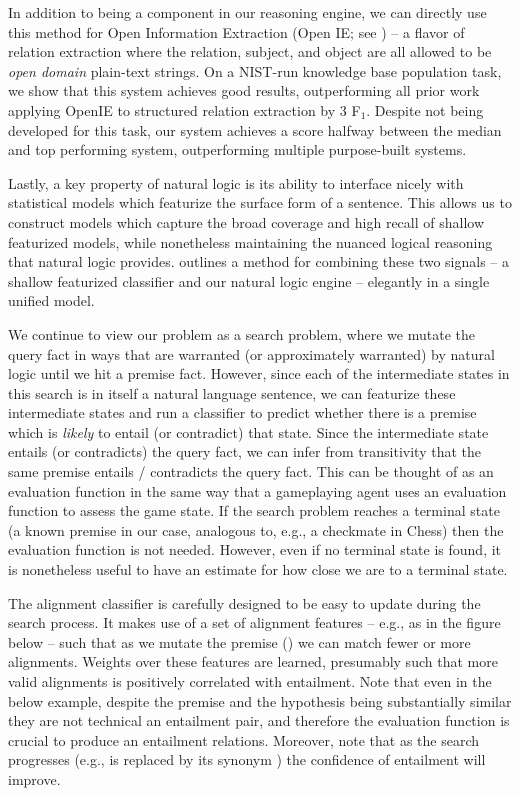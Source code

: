 In addition to being a component in our reasoning engine,
  we can directly use this method for Open Information Extraction 
  (Open IE; see ) -- a flavor of relation 
  extraction where the relation, subject, and 
  object are all allowed to be \textit{open domain} plain-text strings.
On a NIST-run knowledge base population task, we show that this system 
  achieves good results, outperforming all prior work applying OpenIE
  to structured relation extraction by 3 F$_1$.
Despite not being developed for this 
  task, our system achieves a score halfway between the median and top 
  performing system, outperforming multiple purpose-built systems.


%
%
Lastly, a key property of natural logic is its ability to interface nicely with 
  statistical models which featurize the surface form of a sentence.
This allows us to construct models which capture the broad coverage and high recall
  of shallow featurized models, while nonetheless maintaining the nuanced logical
  reasoning that natural logic provides.
 outlines a method for combining these two signals -- a shallow
  featurized classifier and our natural logic engine -- elegantly in
  a single unified model.

We continue to view our problem as a search problem, where we mutate the query fact
  in ways that are warranted (or approximately warranted) by natural logic until we
  hit a premise fact.
However, since each of the intermediate states in this search is in itself a natural
  language sentence, we can featurize these intermediate states and run a classifier
  to predict whether there is a premise which is \textit{likely} to entail (or contradict) that state.
Since the intermediate state entails (or contradicts) the query fact, we can infer
  from transitivity that the same premise entails / contradicts the query fact.
This can be thought of as an evaluation function in the same way that a gameplaying agent
  uses an evaluation function to assess the game state.
If the search problem reaches a terminal state (a known premise in our case, analogous to, e.g., a checkmate
  in Chess) then the evaluation function is not needed.
However, even if no terminal state is found, it is nonetheless useful to have an estimate for how close we
  are to a terminal state.

The alignment classifier is carefully designed to be easy to update during the search
  process.
It makes use of a set of alignment features -- e.g., as in the figure below -- such that
  as we mutate the premise () we can match
  fewer or more alignments.
Weights over these features are learned, presumably such that more valid alignments
  is positively correlated with entailment.
Note that even in the below example, despite the premise and the hypothesis being substantially
  similar they are not technical an entailment pair, and therefore the evaluation function is crucial
  to produce an entailment relations.
Moreover, note that as the search progresses (e.g.,  is replaced by its synonym )
  the confidence of entailment will improve.

